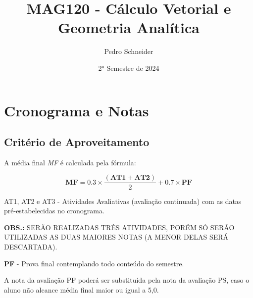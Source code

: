 \documentclass[12pt]{article}
\title{MAG120 - Cálculo Vetorial e Geometria Analítica}
\author{Pedro Schneider}
\date{2° Semestre de 2024}
\begin{document}
\maketitle

\tableofcontents

\pagebreak

\section{Cronograma e Notas}

\subsection{Critério de Aproveitamento}
A média final \textit{MF} é calculada pela fórmula:

\begin{center}
    \[
    \bm{MF} = 0.3 \times \frac{(\bm{AT1} + \bm{AT2})}{2} + 0.7 \times \bm{PF}
    \]
\end{center}

\noindent
AT1, AT2 e AT3 - Atividades Avaliativas (avaliação continuada) com as datas pré-estabelecidas no cronograma.

\noindent
\textbf{OBS.:} SERÃO REALIZADAS TRÊS ATIVIDADES, PORÉM SÓ SERÃO UTILIZADAS AS DUAS MAIORES NOTAS (A MENOR DELAS SERÁ DESCARTADA).

\noindent
\break \textbf{PF} - Prova final contemplando todo conteúdo do semestre.

\noindent
A nota da avaliação PF poderá ser substituída pela nota da avaliação PS, caso o aluno não alcance média final maior ou igual a 5,0.

\renewcommand{\arraystretch}{1.25} %
\end{document}
